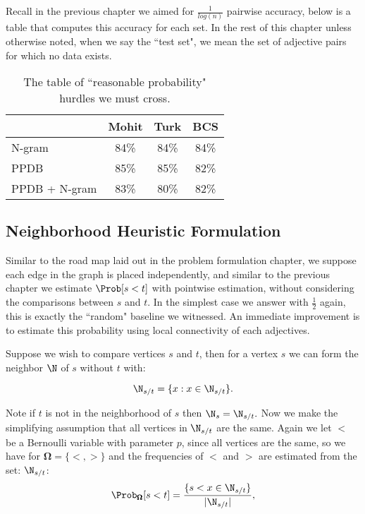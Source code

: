 Recall in the previous chapter we aimed for $\frac{1}{log(n)}$ pairwise accuracy, below is a table that computes this accuracy for each set. In the rest of this chapter unless otherwise noted, when we say the ``test set", we mean the set of adjective pairs for which no data exists.  

\begin{table}
\small
\centering
\begin{tabular}{|l|c|c|c|}
	\hline 
	& \multicolumn{1}{c|}{Mohit} 
	& \multicolumn{1}{c|}{Turk} 
	& \multicolumn{1}{c|}{BCS} \\
	\hline 
	N-gram          & 84\% & 84\% & 84\% \\
	PPDB            & 85\% & 85\% & 82\% \\
	PPDB + N-gram   & 83\% & 80\% & 82\% \\
	\hline
\end{tabular}
\caption{\label{font-table} The table of ``reasonable probability" hurdles we must cross. }
\end{table}



\subsection{Neighborhood Heuristic Formulation}

Similar to the road map laid out in the problem formulation chapter, we suppose each edge in the graph is placed independently, and similar to the previous chapter we estimate $\Prob[ s < t ]$ with pointwise estimation, without considering the comparisons between $s$ and $t$. In the simplest case we answer with $\frac{1}{2}$ again, this is exactly the ``random" baseline we witnessed. An immediate improvement is to estimate this probability using local connectivity of each adjectives. 

Suppose we wish to compare vertices $s$ and $t$, then for a vertex $s$ we can form the neighbor $\N$ of $s$ without $t$ with:

	\[
		\N_{s/t} = \{ x : x \in \N_{s/t}\}.
	\]

Note if $t$ is not in the neighborhood of $s$ then $\N_s = \N_{s/t}.$ Now we make the simplifying assumption that all vertices in $\N_{s/t}$ are the same. Again we let $<$ be a Bernoulli variable with parameter $p$, since all vertices are the same, so we have for $\pmb{\Omega} = \{<,>\}$ and the frequencies of $<$ and $>$ are estimated from the set: $\N_{s/t}$:
	\[
		\Prob_{\pmb{\Omega}}[s < t] = \frac{\{ s < x \in \N_{s/t}\}}{|\N_{s/t}|},
	\]

